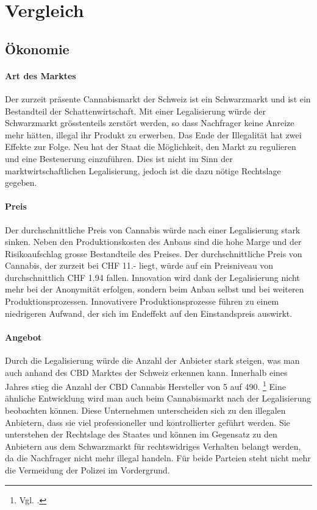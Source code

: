 \documentclass[../main.tex]{subfiles}
\begin{document}
	
	\section{Vergleich}
	
	\subsection{Ökonomie}
	
	\paragraph{Art des Marktes}
	Der zurzeit präsente Cannabismarkt der Schweiz ist ein Schwarzmarkt und ist ein Bestandteil der Schattenwirtschaft.
	Mit einer Legalisierung würde der Schwarzmarkt grösstenteils zerstört werden, so dass Nachfrager keine Anreize mehr hätten, illegal ihr Produkt zu erwerben.
	Das Ende der Illegalität hat zwei Effekte zur Folge. 
	Neu hat der Staat die Möglichkeit, den Markt zu regulieren und eine Besteuerung einzuführen.
	Dies ist nicht im Sinn der marktwirtschaftlichen Legalisierung, jedoch ist die dazu nötige Rechtslage gegeben.
	
	\paragraph{Preis}
	Der durchschnittliche Preis von Cannabis würde nach einer Legalisierung stark sinken.
	Neben den Produktionskosten des Anbaus sind die hohe Marge und der Risikoaufschlag grosse Bestandteile des Preises.
	Der durchschnittliche Preis von Cannabis, der zurzeit bei CHF 11.- liegt, würde auf ein Preisniveau von durchschnittlich CHF 1.94 fallen.
	Innovation wird dank der Legalisierung nicht mehr bei der Anonymität erfolgen, sondern beim Anbau selbst und bei weiteren Produktionsprozessen. 
	Innovativere Produktionsprozesse führen zu einem niedrigeren Aufwand, der sich im Endeffekt auf den Einstandspreis auswirkt.
	
	\paragraph{Angebot}
	Durch die Legalisierung würde die Anzahl der Anbieter stark steigen, was man auch anhand des CBD Marktes der Schweiz erkennen kann.
	Innerhalb eines Jahres stieg die Anzahl der CBD Cannabis Hersteller von 5 auf 490.%
	\footnote{Vgl. \cite{nzz-01}.}	
	Eine ähnliche Entwicklung wird man auch beim Cannabismarkt nach der Legalisierung beobachten können.
	Diese Unternehmen unterscheiden sich zu den illegalen Anbietern, dass sie viel professioneller und kontrollierter geführt werden.
	Sie unterstehen der Rechtslage des Staates und können im Gegensatz zu den Anbietern aus dem Schwarzmarkt für rechtswidriges Verhalten belangt werden, da die Nachfrager nicht mehr illegal handeln.
	Für beide Parteien steht nicht mehr die Vermeidung der Polizei im Vordergrund.
	
\end{document}

